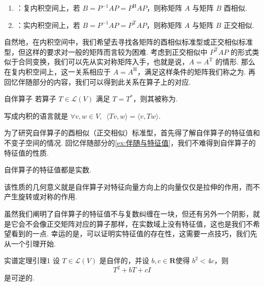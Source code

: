 \begin{definition}{}{}
    \begin{enumerate}
        \item {}：复内积空间上，若 $ B = P^{-1}AP = P^{\mathrm{H}}AP $，则称矩阵 $ A $ 与矩阵 $ B $ 酉相似.

        \item {}：实内积空间上，若 $ B = P^{-1}AP = P^{\mathrm{T}}AP $，则称矩阵 $ A $ 与矩阵 $ B $ 正交相似.
    \end{enumerate}
\end{definition}

自然地，在内积空间中，我们希望去寻找各矩阵的酉相似标准型或正交相似标准型，但这样的要求对一般的矩阵而言较为困难. 考虑到正交相似中 $ P^{\mathrm{T}}AP $ 的形式类似于合同变换，我们可以先从实对称矩阵入手，也就是说，$ A = A^{\mathrm{T}} $ 的情形. 那么在复内积空间上，这一关系相应于 $ A = A^{\mathrm{H}} $，满足这样条件的矩阵我们称之为. 再回忆伴随部分的内容，我们可以得到此关系在算子上的对应.

\begin{definition}{自伴算子}{} 
    若算子 $ T \in \mathcal{L}(V) $ 满足 $ T = T^* $，则其被称为.
\end{definition}

写成内积的语言就是 $ \forall v, w \in V,\enspace \langle Tv, w \rangle = \langle v, Tw \rangle $.

为了研究自伴算子的酉相似（正交相似）标准型，首先得了解自伴算子的特征值和不变子空间的情况. 回忆伴随部分的\autoref{ex:伴随与特征值}，我们不难得到自伴算子的特征值的性质.

\begin{theorem}{}{}
    自伴算子的特征值都是实数.
\end{theorem}

该性质的几何意义就是自伴算子对特征向量方向上的向量仅仅是拉伸的作用，而不产生旋转或对称的作用.

虽然我们阐明了自伴算子的特征值不与复数纠缠在一块，但还有另外一个阴影，就是它会不会像正交矩阵对应的算子那样，在实数域上没有特征值，这也是我们不希望看到的一点. 幸运的是，可以证明实特征值的存在性，这需要一点技巧，我们先从一个引理开始.

\begin{lemma}{}{实谱定理引理1}
    设 $ T \in \mathcal{L}(V) $ 是自伴的，并设 $ b, c \in \mathbf{R} $使得 $ b^2 < 4c $，则
    \[ T^2 + bT + cI \]
    是可逆的.
\end{lemma}

